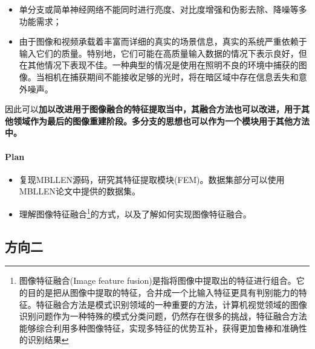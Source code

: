 \documentclass[letterpaper,10pt]{article}
\begin{document}
		\begin{itemize}
			\item{}
			单分支或简单神经网络不能同时进行亮度、对比度增强和伪影去除、降噪等多功能需求；
			\item{}
			由于图像和视频承载着丰富而详细的真实的场景信息，真实的系统严重依赖于输入它们的质量。特别地，它们可能在高质量输入数据的情况下表示良好，但在其他情况下表现不佳。一种典型的情况是使用在照明不良的环境中捕获的图像。当相机在捕获期间不能接收足够的光时，将在暗区域中存在信息丢失和意外噪声。
		\end{itemize}
	
		因此可以\textbf {\color{red}{仔细研究其特征提取模块(FEM)}加以改进用于图像融合的特征提取当中，其融合方法也可以改进，用于其他领域作为最后的图像重建阶段。多分支的思想也可以作为一个模块用于其他方法中。}
		
		\paragraph{Plan}
		
		\begin{itemize}
			\item[ 1)]
			复现MBLLEN源码，研究其特征提取模块(FEM)。数据集部分可以使用MBLLEN论文中提供的数据集。
			\item[ 2)]
			理解图像特征融合\footnote{图像特征融合(Image feature fusion)是指将图像中提取出的特征进行组合。它的目的是把从图像中提取的特征，合并成一个比输入特征更具有判别能力的特征。特征融合方法是模式识别领域的一种重要的方法，计算机视觉领域的图像识别问题作为一种特殊的模式分类问题，仍然存在很多的挑战，特征融合方法能够综合利用多种图像特征，实现多特征的优势互补，获得更加鲁棒和准确性的识别结果}的方式，以及了解如何实现图像特征融合。
		\end{itemize}
	
		\subsection{方向二}
	
		
	
	
\end{document}
